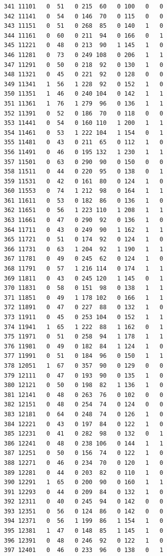 \documentclass[
  letterpaper,
  DIV=11,
  numbers=noendperiod]{scrreprt}
\begin{document}
\begin{verbatim}
341 11101   0  51   0 215  60   0 100   0   0
342 11141   0  54   0 146  70   0 115   0   0
343 11151   0  51   0 268  85   0 140   1   0
344 11161   0  60   0 211  94   0 166   0   1
345 11221   0  48   0 213  90   1 145   1   0
346 11281   0  73   0 249 108   0 206   1   1
347 11291   0  50   0 218  92   0 130   1   0
348 11321   0  45   0 221  92   0 128   0   0
349 11341   1  56   1 228  92   0 152   1   0
350 11351   1  46   0 240 104   0 142   1   1
351 11361   1  76   1 279  96   0 136   1   1
352 11391   0  52   0 186  70   0 118   0   0
353 11441   0  54   0 160 110   1 200   1   1
354 11461   0  53   1 222 104   1 154   0   1
355 11481   0  43   0 211  65   0 112   1   0
356 11491   0  46   0 195 132   1 230   1   1
357 11501   0  63   0 290  90   0 150   0   0
358 11511   0  44   0 220  95   0 138   0   1
359 11531   0  42   0 161  80   0 124   1   0
360 11553   0  74   1 212  98   0 164   1   1
361 11611   0  53   0 182  86   0 136   1   0
362 11651   0  56   1 223 110   1 208   1   1
363 11661   0  47   0 290  92   0 136   1   0
364 11711   0  43   0 249  90   1 162   1   1
365 11721   0  51   0 174  92   0 124   1   0
366 11731   0  63   1 204  92   1 190   1   1
367 11781   0  49   0 245  62   0 124   1   0
368 11791   0  57   1 216 114   0 174   1   1
369 11811   0  43   0 245 120   1 145   0   1
370 11831   0  58   0 151  98   0 138   1   1
371 11851   0  49   1 178 102   0 166   1   1
372 11891   0  47   0 227  88   0 132   1   0
373 11911   0  45   0 253 104   0 152   1   1
374 11941   1  65   1 222  88   1 162   0   1
375 11971   0  51   0 258  94   1 178   1   1
376 11981   0  49   0 182  84   1 124   1   0
377 11991   0  51   0 184  96   0 150   1   1
378 12051   1  67   0 357  90   0 129   0   0
379 12111   0  47   0 193  90   0 135   1   0
380 12121   0  50   0 198  82   1 136   1   0
381 12141   0  48   0 263  76   0 102   0   0
382 12151   0  48   0 254  74   0 124   0   0
383 12181   0  64   0 248  74   0 126   1   0
384 12221   0  43   0 197  84   0 122   1   0
385 12231   0  41   0 282  98   0 132   0   1
386 12241   0  48   0 238 106   0 144   1   1
387 12251   0  50   0 156  74   0 122   1   0
388 12271   0  46   0 234  70   0 120   1   0
389 12281   0  44   0 203  82   0 110   1   0
390 12291   1  65   0 200  90   0 160   1   1
391 12293   0  44   0 209  84   0 132   1   0
392 12311   0  40   0 245  94   0 142   0   0
393 12351   0  56   0 124  86   0 142   0   0
394 12371   0  56   1 199  86   1 154   1   0
395 12381   1  47   0 148  85   1 145   1   0
396 12391   0  48   0 246  92   0 122   1   0
397 12401   0  46   0 233  96   0 138   0   1

\end{verbatim}
\end{document}
